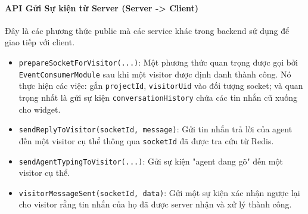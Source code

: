 \paragraph{API Gửi Sự kiện từ Server (Server -> Client)}
Đây là các phương thức public mà các service khác trong backend sử dụng để giao tiếp với client.
\begin{itemize}
    \item \texttt{prepareSocketForVisitor(...)}: Một phương thức quan trọng được gọi bởi \texttt{EventConsumerModule} sau khi một visitor được định danh thành công. Nó thực hiện các việc: gắn \texttt{projectId}, \texttt{visitorUid} vào đối tượng socket; và quan trọng nhất là gửi sự kiện \texttt{conversationHistory} chứa các tin nhắn cũ xuống cho widget.
    
    \item \texttt{sendReplyToVisitor(socketId, message)}: Gửi tin nhắn trả lời của agent đến một visitor cụ thể thông qua \texttt{socketId} đã được tra cứu từ Redis.
    
    \item \texttt{sendAgentTypingToVisitor(...)}: Gửi sự kiện "agent đang gõ" đến một visitor cụ thể.
    
    \item \texttt{visitorMessageSent(socketId, data)}: Gửi một sự kiện xác nhận ngược lại cho visitor rằng tin nhắn của họ đã được server nhận và xử lý thành công.
\end{itemize}